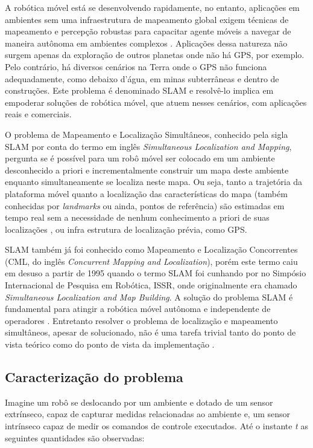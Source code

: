 
A robótica móvel está se desenvolvendo rapidamente, no entanto, aplicações 
em ambientes sem uma infraestrutura de mapeamento global exigem técnicas 
de mapeamento e percepção robustas para capacitar agente móveis a 
navegar de maneira autônoma em ambientes complexos \cite{saeedi2016multiple}. Aplicações dessa 
natureza não surgem apenas da exploração de outros planetas onde não há 
GPS, por exemplo. Pelo contrário, há diversos cenários na Terra onde o 
GPS não funciona adequadamente, como debaixo d'água, 
em minas subterrâneas e dentro de construções. Este problema é denominado SLAM e resolvê-lo implica em empoderar soluções de robótica móvel, 
que atuem nesses cenários, com aplicações reais e comerciais.

O problema de Mapeamento e Localização Simultâneos, conhecido pela sigla SLAM por conta do termo em inglês \textit{Simultaneous Localization and Mapping}, pergunta se é possível para um robô móvel ser colocado em um ambiente desconhecido a priori e incrementalmente construir um mapa deste ambiente enquanto simultaneamente se localiza neste mapa. Ou seja, tanto a trajetória da plataforma móvel quanto a localização das características do mapa (também conhecidas por \textit{landmarks} ou ainda, pontos de referência) são estimadas em tempo real sem a necessidade de nenhum conhecimento a priori de suas localizações \cite{durrant2006simultaneous}, ou infra estrutura de localização prévia, como GPS.

SLAM também já foi conhecido como Mapeamento e Localização Concorrentes (CML, do inglês \textit{Concurrent Mapping and Localization}), porém este termo caiu em desuso a partir de 1995 quando o termo SLAM foi cunhando por  no Simpósio Internacional de Pesquisa em Robótica, ISSR, onde originalmente era chamado \textit{Simultaneous Localization and Map Building}. A solução do problema SLAM é fundamental para atingir a robótica móvel autônoma e independente de operadores \cite{durrant2006simultaneous}. Entretanto resolver o problema de localização e mapeamento simultâneos, apesar de solucionado, não é uma tarefa trivial tanto do ponto de vista teórico como do ponto de vista da implementação \cite{durrant1996localization}.

\subsection*{Caracterização do problema}
Imagine um robô se deslocando por um ambiente e dotado de um sensor extrínseco, capaz de capturar medidas relacionadas ao 
ambiente e, um sensor intrínseco capaz de medir os comandos de 
controle executados. Até o instante \emph{t} as seguintes 
quantidades são observadas:

